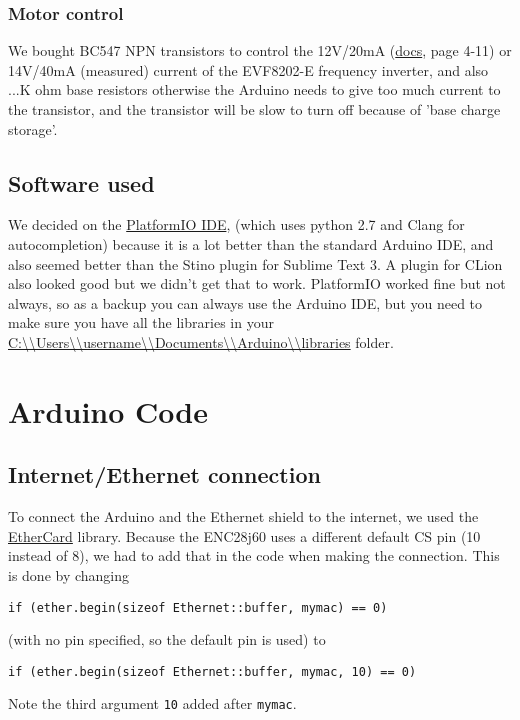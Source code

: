 \documentclass{article}
\begin{document}
		\subsubsection{Motor control}
		We bought BC547 NPN transistors to control the 12V/20mA (\href{http://download.lenze.com/TD/8201-8204__Inverter__v02-08__EN.pdf }{docs}, page 4-11) or 14V/40mA (measured) current of the EVF8202-E frequency inverter, and also ...K ohm base resistors otherwise the Arduino needs to give too much current to the transistor, and the transistor will be slow to turn off because of 'base charge storage'.
	
		\subsection{Software used}
		We decided on the \href{http://platformio.org/platformio-ide}{PlatformIO IDE}, (which uses python 2.7 and Clang for autocompletion) because it is a lot better than the standard Arduino IDE, and also seemed better than the Stino plugin for Sublime Text 3. A plugin for CLion also looked good but we didn't get that to work. PlatformIO worked fine but not always, so as a backup you can always use the Arduino IDE, but you need to make sure you have all the libraries in your \url{C:\\Users\\username\\Documents\\Arduino\\libraries} folder.
	
	\section{Arduino Code}
		\subsection{Internet/Ethernet connection}
			To connect the Arduino and the Ethernet shield to the internet, we used the \href{https://github.com/jcw/ethercard}{EtherCard} library. Because the ENC28j60 uses a different default CS pin (10 instead of 8), we had to add that in the code when making the connection. This is done by changing
			\begin{lstlisting}
if (ether.begin(sizeof Ethernet::buffer, mymac) == 0)
			\end{lstlisting}
			(with no pin specified, so the default pin is used) to
			\begin{lstlisting}
if (ether.begin(sizeof Ethernet::buffer, mymac, 10) == 0)
			\end{lstlisting}
			Note the third argument \lstinline|10| added after \lstinline|mymac|.
\end{document}
